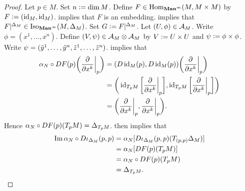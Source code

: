 \documentclass{book}
\begin{document}
\begin{proof}
	Let $p \in M$. Set $n \vcentcolon= \dim M$. Define $F \in \operatorname{Hom}_{\operatorname*{\text{\textbf{Man}}^{\infty}}}(M, M \times M)$ by $F \vcentcolon= (\operatorname{id}_M, \operatorname{id}_M)$.  implies that $F$ is an embedding.  implies that $F|^{\Delta_M} \in \operatorname{Iso}_{\operatorname*{\text{\textbf{Man}}^{\infty}}}(M, \Delta_M)$. Set $G \vcentcolon= F|^{\Delta_M}$. Let $(U, \phi) \in \mathcal{A}_M$. Write $\phi = (x^1, \ldots, x^n)$. Define $(V, \psi) \in \mathcal{A}_M \otimes \mathcal{A}_M$ by $V \vcentcolon= U \times U$ and $\psi \vcentcolon= \phi \times \phi$. Write $\psi = (\tilde{y}^1, \ldots, \tilde{y}^n, \tilde{z}^1, \ldots, \tilde{z}^n)$.
	 implies that 
	\begin{align*}
		\alpha_N \circ DF(p) \bigg( \frac{\partial}{\partial x^k} \bigg|_{p} \bigg)
		 & = (D \operatorname{id}_M(p), D \operatorname{id}_M(p)) \bigg( \frac{\partial}{\partial x^k} \bigg|_p \bigg) \\
		 & = \bigg( \operatorname{id}_{T_pM} \bigg[ \frac{\partial}{\partial x^k} \bigg|_p \bigg], \operatorname{id}_{T_pM} \bigg[ \frac{\partial}{\partial x^k} \bigg|_{p} \bigg] \bigg) \\
		 & = \bigg( \frac{\partial}{\partial x^k} \bigg|_p, \frac{\partial}{\partial x^k} \bigg|_p \bigg). 
	\end{align*}
	Hence $\alpha_N \circ DF(p)(T_p M) = \Delta_{T_p M}$.  then implies that 
	\begin{align*}
		\text{Im} \, \alpha_N \circ D \iota_{\Delta_M}(p,p)
		& = \alpha_N [D \iota_{\Delta_M}(p,p)(T_{(p,p)} \Delta_M)] \\
		& = \alpha_N [DF(p)(T_{p}M)] \\
		& = \alpha_N \circ DF(p)(T_p M) \\
		& = \Delta_{T_p M}.
	\end{align*}
\end{proof}
\end{document}
